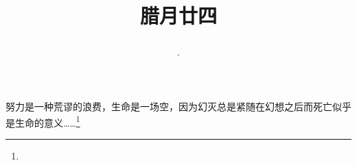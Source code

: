 \title{\date[d=3,m=2,y=2024][year:cn-y,年,month:cn,day:cn,日,·,weekday]·腊月廿四 }
努力是一种荒谬的浪费，生命是一场空，因为幻灭总是紧随在幻想之后而死亡似乎是生命的意义……\footnote{ }

